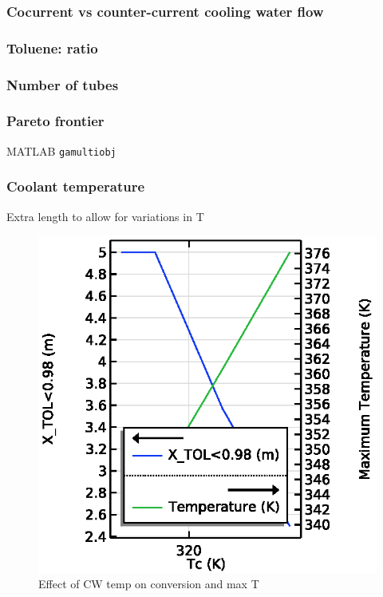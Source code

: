 \subsubsection{Cocurrent vs counter-current cooling water flow}

\subsubsection{Toluene:  ratio}

\subsubsection{Number of tubes}

\subsubsection{Pareto frontier}
MATLAB \texttt{gamultiobj}

\subsubsection{Coolant temperature}
Extra length to allow for variations in T

\begin{figure}[h]
    \centering
    \includegraphics[width=0.49\linewidth]{figures/S4-CW-X-T.eps}
    \caption{Effect of CW temp on conversion and max T}
    \label{fig:comsol-S4-CW-X-T}
\end{figure}
